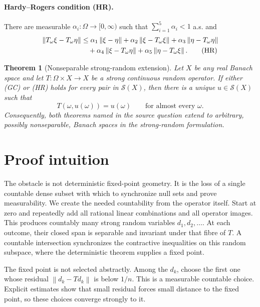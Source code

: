 \documentclass[11pt]{article}
\newtheorem{theorem}{Theorem}
\newcommand{\cS}{\mathcal S}
\newcommand{\norm}[1]{\left\lVert #1\right\rVert}
\begin{document}
\paragraph{Hardy--Rogers condition (HR).}
There are measurable $\alpha_i:\Omega\to[0,\infty)$ such that
$\sum_{i=1}^{5}\alpha_i<1$ a.s. and
\begin{align}
 \norm{T_\omega\xi-T_\omega\eta}
 &\le \alpha_1\norm{\xi-\eta}
 +\alpha_2\norm{\xi-T_\omega\xi}
 +\alpha_3\norm{\eta-T_\omega\eta} \notag\\
 &\quad+\alpha_4\norm{\xi-T_\omega\eta}
 +\alpha_5\norm{\eta-T_\omega\xi}.
 \tag{HR}
\end{align}

\begin{theorem}[Nonseparable strong-random extension]\label{thm:main}
Let $X$ be any real Banach space and let $T:\Omega\times X\to X$ be a
strong continuous random operator.  If either \emph{(GC)} or \emph{(HR)}
holds for every pair in $\cS(X)$, then there is a unique
$u\in\cS(X)$ such that
\[
 T(\omega,u(\omega))=u(\omega)\qquad\text{for almost every }\omega.
\]
Consequently, both theorems named in the source question extend to arbitrary,
possibly nonseparable, Banach spaces in the strong-random formulation.
\end{theorem}

\section{Proof intuition}

The obstacle is not deterministic fixed-point geometry.  It is the loss of a
single countable dense subset with which to synchronize null sets and prove
measurability.  We create the needed countability from the operator itself.
Start at zero and repeatedly add all rational linear combinations and all
operator images.  This produces countably many strong random variables
$d_1,d_2,\ldots$.  At each outcome, their closed span is separable and
invariant under that fibre of $T$.  A countable intersection synchronizes the
contractive inequalities on this random subspace, where the deterministic
theorem supplies a fixed point.

The fixed point is not selected abstractly.  Among the $d_k$, choose the first
one whose residual $\norm{d_k-Td_k}$ is below $1/n$.  This is a measurable
countable choice.  Explicit estimates show that small residual forces small
distance to the fixed point, so these choices converge strongly to it.
\end{document}
